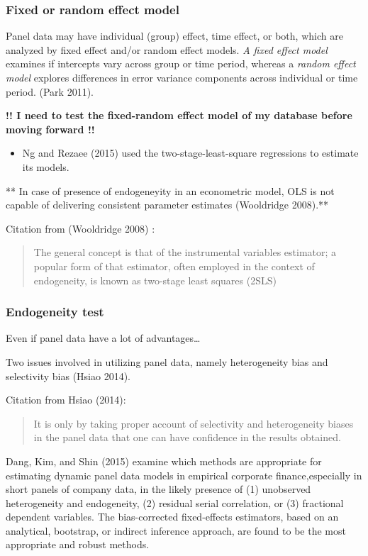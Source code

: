 \documentclass[12pt,]{article}
\providecommand{\tightlist}{%
  \setlength{\itemsep}{0pt}\setlength{\parskip}{0pt}}
\begin{document}
\subsubsection{Fixed or random effect
model}\label{fixed-or-random-effect-model}

Panel data may have individual (group) effect, time effect, or both,
which are analyzed by fixed effect and/or random effect models. \emph{A
fixed effect model} examines if intercepts vary across group or time
period, whereas a \emph{random effect model} explores differences in
error variance components across individual or time period. (Park 2011).

\textbf{!! I need to test the fixed-random effect model of my database
before moving forward !!}

\begin{itemize}
\tightlist
\item
  Ng and Rezaee (2015) used the two-stage-least-square regressions to
  estimate its models.
\end{itemize}

** In case of presence of endogeneyity in an econometric model, OLS is
not capable of delivering consistent parameter estimates (Wooldridge
2008).**

Citation from (Wooldridge 2008) :

\begin{quote}
The general concept is that of the instrumental variables estimator; a
popular form of that estimator, often employed in the context of
endogeneity, is known as two-stage least squares (2SLS)
\end{quote}

\subsubsection{Endogeneity test}\label{endogeneity-test}

Even if panel data have a lot of advantages\ldots{}

Two issues involved in utilizing panel data, namely heterogeneity bias
and selectivity bias (Hsiao 2014).

Citation from Hsiao (2014):

\begin{quote}
It is only by taking proper account of selectivity and heterogeneity
biases in the panel data that one can have confidence in the results
obtained.
\end{quote}

Dang, Kim, and Shin (2015) examine which methods are appropriate for
estimating dynamic panel data models in empirical corporate
finance,especially in short panels of company data, in the likely
presence of (1) unobserved heterogeneity and endogeneity, (2) residual
serial correlation, or (3) fractional dependent variables. The
bias-corrected fixed-effects estimators, based on an analytical,
bootstrap, or indirect inference approach, are found to be the most
appropriate and robust methods.
\end{document}
